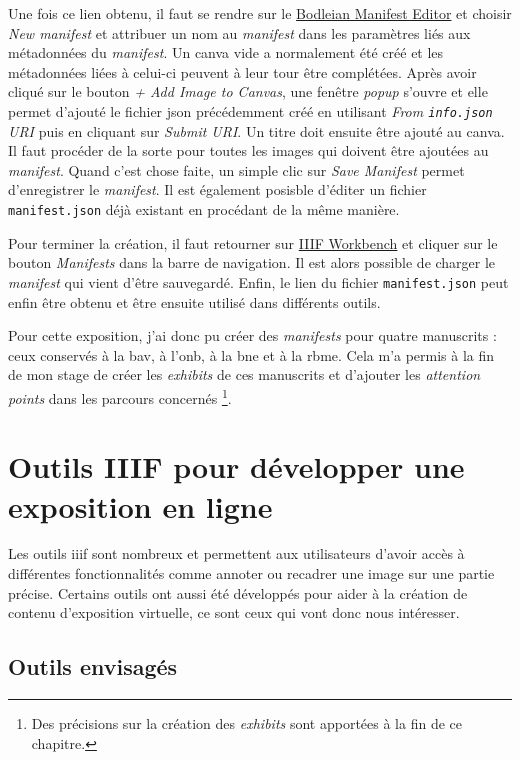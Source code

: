 	Une fois ce lien obtenu, il faut se rendre sur le \href{https://digital.bodleian.ox.ac.uk/manifest-editor/#/?_k=xqu304}{Bodleian Manifest Editor} et choisir \textit{New manifest} et attribuer un nom au \textit{manifest} dans les paramètres liés aux métadonnées du \textit{manifest}. Un canva vide a normalement été créé et les métadonnées liées à celui-ci peuvent à leur tour être complétées. Après avoir cliqué sur le bouton \textit{+ Add Image to Canvas}, une fenêtre \textit{popup} s'ouvre et elle permet d'ajouté le fichier \acrshort{json} précédemment créé en utilisant \textit{From \texttt{info.json} URI} puis en cliquant sur \textit{Submit URI}. Un titre doit ensuite être ajouté au canva. Il faut procéder de la sorte pour toutes les images qui doivent être ajoutées au \textit{manifest}. Quand c'est chose faite, un simple clic sur \textit{Save Manifest} permet d'enregistrer le \textit{manifest}. Il est également posisble d'éditer un fichier \texttt{manifest.json} déjà existant en procédant de la même manière.
	
	Pour terminer la création, il faut retourner sur \href{https://workbench.gdmrdigital.com/}{IIIF Workbench} et cliquer sur le bouton \textit{Manifests} dans la barre de navigation. Il est alors possible de charger le \textit{manifest} qui vient d'être sauvegardé. Enfin, le lien du fichier \texttt{manifest.json} peut enfin être obtenu et être ensuite utilisé dans différents outils. 
	
	Pour cette exposition, j'ai donc pu créer des \textit{manifests} pour quatre manuscrits : ceux conservés à la \acrlong{bav}, à l'\acrlong{onb}, à la \acrlong{bne} et à la \acrlong{rbme}. Cela m'a permis à la fin de mon stage de créer les \textit{exhibits} de ces manuscrits et d'ajouter les \textit{attention points} dans les parcours concernés \footnote{Des précisions sur la création des \textit{exhibits} sont apportées à la fin de ce chapitre.}.
	

    \section{Outils IIIF pour développer une exposition en ligne}
    Les outils \acrshort{iiif} sont nombreux et permettent aux utilisateurs d'avoir accès à différentes fonctionnalités comme annoter ou recadrer une image sur une partie précise. Certains outils ont aussi été développés pour aider à la création de contenu d'exposition virtuelle, ce sont ceux qui vont donc nous intéresser. 
    
	\subsection{Outils envisagés}
